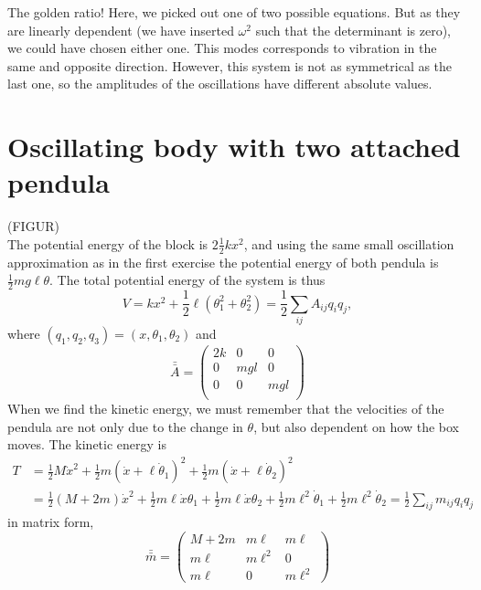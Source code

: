 \documentclass{article}
\begin{document}
    The golden ratio! Here, we picked out one of two possible equations. But as they are linearly dependent (we have inserted $\omega^2$ such that the determinant is zero), we could have chosen either one. This modes corresponds to vibration in the same and opposite direction. However, this system is not as symmetrical as the last one, so the amplitudes of the oscillations have different absolute values. 

    \section{Oscillating body with two attached pendula}
    (FIGUR) \\
    The potential energy of the block is $2\frac{1}{2}k x^2$, and using the same small oscillation approximation as in the first exercise the potential energy of both pendula is $\frac{1}{2}mg\ell \theta$. The total potential energy of the system is thus
    \begin{equation*}
        V = kx^2 + \frac{1}{2}\ell(\theta_1^2 + \theta_2^2) = \frac{1}{2} \sum_{ij} A_{ij} q_i q_j, 
    \end{equation*}
    where $(q_1, q_2, q_3) = (x, \theta_1, \theta_2)$ and
    \begin{equation*}
        \bar {\bar A} =
        \begin{pmatrix*}
            2k & 0 & 0 \\
            0 & mgl & 0 \\
            0 & 0 & mgl \\
        \end{pmatrix*}
    \end{equation*}
    When we find the kinetic energy, we must remember that the velocities of the pendula are not only due to the change in $\theta$, but also dependent on how the box moves. The kinetic energy is
    \begin{align*}
        T &= \frac{1}{2} M \dot x^2 + \frac{1}{2}m (\dot x + \ell \dot \theta_1)^2 + \frac{1}{2}m (\dot x + \ell \dot \theta_2)^2\\
        &= \frac{1}{2} (M + 2m) \dot x^2 + \frac{1}{2} m \ell \dot x \theta_1 + \frac{1}{2} m \ell \dot x \theta_2 + \frac{1}{2}m\ell^2\dot \theta_1 + \frac{1}{2}m\ell^2\dot \theta_2 = \frac{1}{2}\sum_{ij}m_{ij}q_iq_j
    \end{align*}
    in matrix form, 
    \begin{equation*}
        \bar {\bar m} = 
        \begin{pmatrix*}
            M + 2m & m\ell & m \ell \\
            m\ell & m\ell^2 & 0 \\
            m\ell & 0 & m\ell^2
        \end{pmatrix*}
    \end{equation*}
\end{document}
